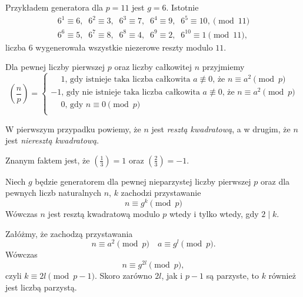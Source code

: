 \vspace{10px}

\noindent
Przykładem generatora dla $p = 11$ jest $g = 6$. Istotnie
\begin{gather*}
	6^1 \equiv 6, \;\; 6^2 \equiv 3, \;\; 6^3 \equiv 7, \;\;
	6^4 \equiv 9, \;\; 6^5 \equiv 10, \pmod{11} \\
	 6^6 \equiv 5, \;\;
	6^7 \equiv 8, \;\; 6^8 \equiv 4, \;\; 6^9 \equiv 2, \;\; 6^{10} \equiv 1 \pmod{11},
\end{gather*}
liczba $6$ wygenerowała wszystkie niezerowe reszty modulo $11$.

\newpage


\noindent
Dla pewnej liczby pierwszej $p$ oraz liczby całkowitej $n$ przyjmiemy
\[
	\left(\frac{n}{p}\right) = 
	\begin{cases}
		\phantom{-}1 \text{, gdy istnieje taka liczba całkowita } a \not\equiv 0 \text{, że } n \equiv a^2 \pmod{p}\\
		-1\text{, gdy nie istnieje taka liczba całkowita } a \not\equiv 0 \text{, że } n \equiv a^2 \pmod{p} \\
		\phantom{-}0 \text{, gdy } n \equiv 0 \pmod{p}\\
	\end{cases}
\]

\noindent
W pierwszym przypadku powiemy, że $n$ jest \textit{resztą kwadratową}, a w drugim, że $n$ jest \textit{nieresztą kwadratową}.

\vspace{10px}
\noindent
Znanym faktem jest, że $\left(\frac{1}{3}\right) = 1$ oraz $\left(\frac{2}{3}\right) = -1$.

\vspace{10px}


\noindent
Niech $g$ będzie generatorem dla pewnej nieparzystej liczby pierwszej $p$ oraz dla pewnych liczb naturalnych $n$, $k$ zachodzi przystawanie
\[
	n \equiv g^k \pmod{p}
\] 
Wówczas $n$ jest resztą kwadratową modulo $p$ wtedy i tylko wtedy, gdy $2 \mid k$.

\vspace{5px}


\noindent
Załóżmy, że zachodzą przystawania
\[
	n \equiv a^2 \pmod{p} \quad a \equiv g^l \pmod{p}.
\]
Wówczas
\[
	n \equiv g^{2l} \pmod{p},
\]
czyli $k \equiv 2l \pmod{p - 1}$. Skoro zarówno $2l$, jak i $p - 1$ są parzyste, to $k$ również jest liczbą parzystą.

